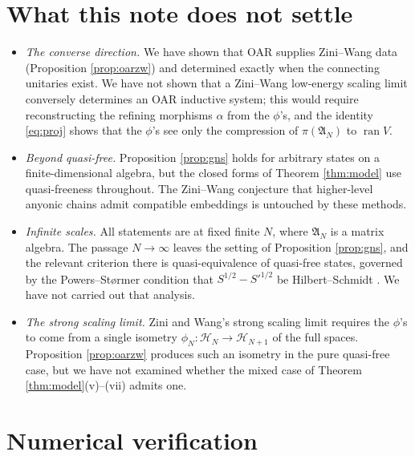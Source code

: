 \documentclass[11pt,a4paper]{article}
\theoremstyle{definition}
\newcommand{\fA}{\mathfrak{A}}
\newcommand{\cH}{\mathcal{H}}
\newcommand{\1}{\mathds{1}}
\newcommand{\ran}{\operatorname{ran}}
\begin{document}
\section{What this note does not settle}
\label{sec:open}

\begin{itemize}
\item \emph{The converse direction.} We have shown that OAR supplies Zini--Wang data (Proposition
\ref{prop:oarzw}) and determined exactly when the connecting unitaries exist. We have not shown that
a Zini--Wang low-energy scaling limit conversely determines an OAR inductive system; this would
require reconstructing the refining morphisms $\alpha$ from the $\phi$'s, and the identity
\eqref{eq:proj} shows that the $\phi$'s see only the compression of $\pi(\fA_{N})$ to $\ran V$.
\item \emph{Beyond quasi-free.} Proposition \ref{prop:gns} holds for arbitrary states on a
finite-dimensional algebra, but the closed forms of Theorem \ref{thm:model} use quasi-freeness
throughout. The Zini--Wang conjecture that higher-level anyonic chains admit compatible embeddings
\cite[p.~898]{ZiniWang} is untouched by these methods.
\item \emph{Infinite scales.} All statements are at fixed finite $N$, where $\fA_{N}$ is a matrix
algebra. The passage $N\rightarrow\infty$ leaves the setting of Proposition \ref{prop:gns}, and the
relevant criterion there is quasi-equivalence of quasi-free states, governed by the Powers--St\o rmer
condition that $S^{1/2}-S'^{1/2}$ be Hilbert--Schmidt \cite{Araki,PowersStormer}. We have not
carried out that analysis.
\item \emph{The strong scaling limit.} Zini and Wang's strong scaling limit requires the $\phi$'s to
come from a single isometry $\phi_{N}:\cH_{N}\rightarrow\cH_{N+1}$ of the full spaces. Proposition
\ref{prop:oarzw} produces such an isometry in the pure quasi-free case, but we have not examined
whether the mixed case of Theorem \ref{thm:model}(v)--(vii) admits one.
\end{itemize}

\section*{Numerical verification}
\end{document}

